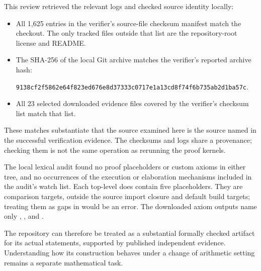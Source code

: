 This review retrieved the relevant logs and checked source identity locally:

\begin{itemize}
\item All 1,625 entries in the verifier's source-file checksum manifest match the checkout. The only tracked files outside that list are the repository-root license and README.
\item The SHA-256 of the local Git archive matches the verifier's reported archive hash:
\begin{center}\small
\nolinkurl{9138cf2f5862e64f823ed676e8d37333c0717e1a13cd8f74f6b735ab2d1ba57c}.
\end{center}
\item All 23 selected downloaded evidence files covered by the verifier's checksum list match that list.
\end{itemize}

These matches substantiate that the source examined here is the source named in the successful verification evidence. The checksums and logs share a provenance; checking them is not the same operation as rerunning the proof kernels.

The local lexical audit found no proof placeholders or custom axioms in either  tree, and no occurrences of the execution or elaboration mechanisms included in the audit's watch list. Each top-level  does contain five  placeholders. They are comparison targets, outside the source import closure and default build targets; treating them as gaps in  would be an error. The downloaded axiom outputs name only , , and .


The repository can therefore be treated as a substantial formally checked artifact for its actual statements, supported by published independent evidence. Understanding how its construction behaves under a change of arithmetic setting remains a separate mathematical task.

